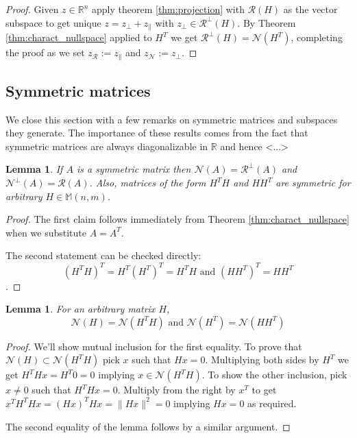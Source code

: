\documentclass[a4paper]{article}
\theoremstyle{break}
\newtheorem{lemma}[theorem]{Lemma}
\newcommand{\R}{\mathbb{R}}
\newcommand{\Nu}{\mathcal{N}}
\newcommand{\Ra}{\mathcal{R}}
\newcommand{\Mat}[2]{\mathbb{M}(#1, #2)}
\newcommand{\pll}{\parallel}
\begin{document}
\begin{proof}
    Given $ z \in \R^n$  apply theorem \ref{thm:projection} with $\Ra(H)$ as the vector subspace to get unique
    $ z = z_\perp + z_\pll$ with $z_\perp \in \Ra^\perp(H)$. By Theorem \ref{thm:charact_nullspace} applied to $H^T$ we get $\Ra^\perp(H) = \Nu(H^T)$, completing the proof as we set $z_\Ra := z_\pll$ and $z_\Nu := z_\perp$.
\end{proof}

\subsection{Symmetric matrices}
We close this section with a few remarks on symmetric matrices and subspaces they generate. The importance of these results comes from the fact that symmetric matrices are always diagonalizable in $\R$ and hence <...>

\begin{lemma} \label{lem:charact_sym_nullspace}
    If $A$ is a symmetric matrix then $\Nu(A) = \Ra^\perp(A)$ and $\Nu^\perp(A) = \Ra(A)$.
    Also, matrices of the form $H^T H$ and $H H^T$ are symmetric for arbitrary $H \in \Mat{n}{m}$.
\end{lemma}

\begin{proof}
    The first claim follows immediately from Theorem \ref{thm:charact_nullspace} when we substitute $A = A^T$.
    
    The second statement can be checked directly:
    $$(H^T H)^T = H^T (H^T)^T = H^T H \text{ and } (H H^T)^T = H H^T$$.
\end{proof}

\begin{lemma}
    \label{lem:nullspaces_hht}
    For an arbitrary matrix $H$,
    $$\Nu(H) = \Nu(H^T H) \text{ and } \Nu(H^T) = \Nu(H H^T)$$
\end{lemma}

\begin{proof}
    We'll show mutual inclusion for the first equality. To prove that $\Nu(H) \subset \Nu(H^T H)$ pick $x$ such that $H x = 0$. Multiplying both sides by $H^T$ we get $ H^T H x = H^T 0 = 0 $ implying $x \in \Nu(H^T H) $. To show the other inclusion, pick $x \neq 0$ such that $H^T H x = 0$. Multiply from the right by $x^T$ to get $ x^T H^T H x = (H x)^T H x = \| H x \|^2 = 0 $ implying $ H x =0 $ as required.
    
    The second equality of the lemma follows by a similar argument.
\end{proof}
\end{document}
